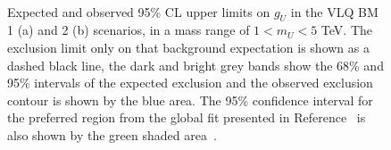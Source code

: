 \begin{figure}[!hbtp]
\centering
     \\
\caption{Expected and observed 95\% CL upper limits on $g_U$ in the VLQ BM 1 (a) and 2 (b) scenarios, in a mass range of $1<m_{U}<5$ TeV.  The exclusion limit only on that background expectation is shown as a dashed black line, the dark and bright grey bands show the 68\% and 95\% intervals of the expected exclusion and the observed exclusion contour is shown by the blue area. The 95\% confidence interval for the preferred region from the global fit presented in Reference~\cite{Cornella:2021sby} is also shown by the green shaded area~\cite{CMS:2022rbd}.}
\label{fig:vlq_limits}
\end{figure}

